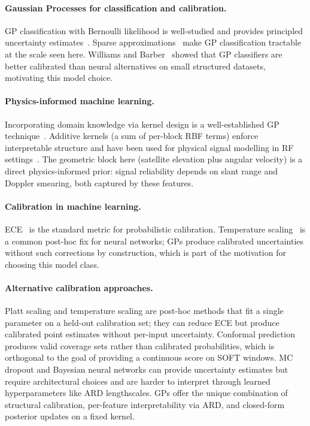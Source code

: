 \documentclass{article}
\begin{document}
\paragraph{Gaussian Processes for classification and calibration.}
GP classification with Bernoulli likelihood is well-studied and provides
principled uncertainty estimates~\cite{rasmussen2006gaussian, milios2018dirichlet}.
Sparse approximations~\cite{titsias2009variational} make GP classification tractable
at the scale seen here.
Williams and Barber~\cite{williams1998bayesian} showed that GP classifiers are better
calibrated than neural alternatives on small structured datasets, motivating
this model choice.

\paragraph{Physics-informed machine learning.}
Incorporating domain knowledge via kernel design is a well-established GP
technique~\cite{duvenaud2014automatic}.
Additive kernels (a sum of per-block RBF terms) enforce interpretable structure
and have been used for physical signal modelling in RF
settings~\cite{solin2020hilbert}.
The geometric block here (satellite elevation plus angular velocity) is a direct
physics-informed prior: signal reliability depends on slant range and Doppler
smearing, both captured by these features.

\paragraph{Calibration in machine learning.}
ECE~\cite{naeini2015obtaining} is the standard metric for probabilistic calibration.
Temperature scaling~\cite{guo2017calibration} is a common post-hoc fix for neural
networks; GPs produce calibrated uncertainties without such corrections by
construction, which is part of the motivation for choosing this model class.

\paragraph{Alternative calibration approaches.}
Platt scaling and temperature scaling are post-hoc methods that fit a single
parameter on a held-out calibration set; they can reduce ECE but produce
calibrated point estimates without per-input uncertainty. Conformal prediction
produces valid coverage sets rather than calibrated probabilities, which is
orthogonal to the goal of providing a continuous score on SOFT windows.
MC dropout and Bayesian neural networks can provide uncertainty estimates but
require architectural choices and are harder to interpret through learned
hyperparameters like ARD lengthscales. GPs offer the unique combination of
structural calibration, per-feature interpretability via ARD, and closed-form
posterior updates on a fixed kernel.
\end{document}
